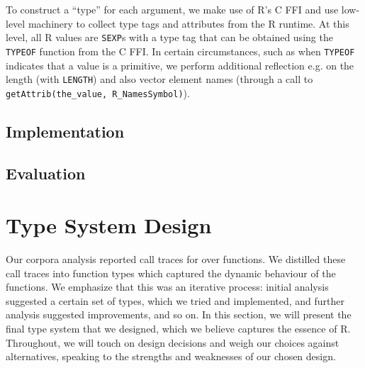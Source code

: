 \documentclass[acmsmall,review,anonymous]{acmart}\settopmatter{printfolios=true,printccs=false,printacmref=false}
\begin{document}
To construct a ``type'' for each argument, we make use of R's C FFI and use low-level machinery to collect type tags and attributes from the R runtime.
At this level, all R values are {\tt SEXP}s with a type tag that can be obtained using the {\tt TYPEOF} function from the C FFI.
In certain circumstances, such as when {\tt TYPEOF} indicates that a value is a primitive, we perform additional reflection e.g. on the length (with {\tt LENGTH}) and also vector element names (through a call to {\tt getAttrib(the\_value, R\_NamesSymbol)}).

\subsection{Implementation}


\subsection{Evaluation}



%
%
%
%
%
%
\section{Type System Design}
\label{sec:typesystemdesign}

Our corpora analysis reported  call traces for over  functions.
We distilled these call traces into function types which captured the dynamic behaviour of the functions.
We emphasize that this was an iterative process: initial analysis suggested a certain set of types, which we tried and implemented, and further analysis suggested improvements, and so on.
In this section, we will present the final type system that we designed, which we believe captures the essence of R.
Throughout, we will touch on design decisions and weigh our choices against alternatives, speaking to the strengths and weaknesses of our chosen design.
\end{document}
